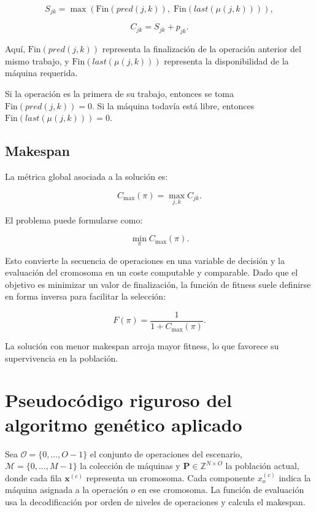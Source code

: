 \documentclass[11pt,a4paper]{article}
\begin{document}
$$
S_{jk} = \max\left(\text{Fin}(pred(j,k)),\;\text{Fin}(last(\mu(j,k)))\right),
$$

$$
C_{jk} = S_{jk} + p_{jk}.
$$

Aquí, $\text{Fin}(pred(j,k))$ representa la finalización de la operación anterior del mismo trabajo, y $\text{Fin}(last(\mu(j,k)))$ representa la disponibilidad de la máquina requerida.

Si la operación es la primera de su trabajo, entonces se toma $\text{Fin}(pred(j,k)) = 0$. Si la máquina todavía está libre, entonces $\text{Fin}(last(\mu(j,k))) = 0$.

\subsection{Makespan}

La métrica global asociada a la solución es:

$$
C_{\max}(\pi) = \max_{j,k} C_{jk}.
$$

El problema puede formularse como:

$$
\min_{\pi} C_{\max}(\pi).
$$

Esto convierte la secuencia de operaciones en una variable de decisión y la evaluación del cromosoma en un coste computable y comparable. Dado que el objetivo es minimizar un valor de finalización, la función de fitness suele definirse en forma inversa para facilitar la selección:

$$
F(\pi) = \frac{1}{1 + C_{\max}(\pi)}.
$$

La solución con menor makespan arroja mayor fitness, lo que favorece su supervivencia en la población.

\section{Pseudocódigo riguroso del algoritmo genético aplicado}

Sea $\mathcal{O} = \{0,\dots,O-1\}$ el conjunto de operaciones del escenario, $\mathcal{M} = \{0,\dots,M-1\}$ la colección de máquinas y $\mathbf{P} \in \mathbb{Z}^{N \times O}$ la población actual, donde cada fila $\mathbf{x}^{(c)}$ representa un cromosoma. Cada componente $x^{(c)}_o$ indica la máquina asignada a la operación $o$ en ese cromosoma. La función de evaluación usa la decodificación por orden de niveles de operaciones y calcula el makespan.
\end{document}
